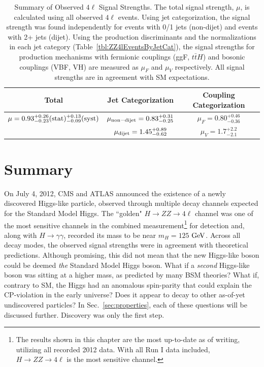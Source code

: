 \begin{table}[htbp]
\begin{center}
\begin{tabular}{c|c|c}
\hline \hline
      Total  & Jet Categorization  &  Coupling Categorization \\
      \hline
      $\mu = 0.93^{+0.26}_{-0.23}(\rm{stat}) ^{+0.13}_{-0.09}(\rm{syst})$ & $\mu_{\rm{non-dijet}}=0.83^{+0.31}_{-0.25}$ & $\mu_F = 0.80^{+0.46}_{-0.36}$ \\
      & $\mu_{\rm{dijet}} = 1.45^{+0.89}_{-0.62}$ & $\mu_V=1.7^{+2.2}_{-2.1}$  \\
      \hline
\end{tabular}
\caption[Summary of Observed $4\ell$ Signal Strengths]{Summary of Observed $4\ell$ Signal Strengths. The total signal strength, $\mu$, is calculated using all observed $4\ell$ events. Using jet categorization, the signal strength was found independently for events with 0/1 jets (non-dijet) and events with 2+ jets (dijet). Using the production discriminants and the normalizations in each jet category (Table~\ref{tbl:ZZ4lEventsByJetCat}), the signal strengths for production mechanisms with fermionic couplings (ggF, $t\bar{t}H$) and bosonic couplings (VBF, VH) are measured as $\mu_F$ and $\mu_V$ respectively. All signal strengths are in agreement with SM expectations.
\label{tbl:ZZ4lSignalStrengths}}
\end{center}
\end{table}

\section{Summary}
\label{sec:discovery_summary}

On July 4, 2012, CMS and ATLAS announced the existence of a newly discovered Higgs-like particle, observed through multiple decay channels expected for the Standard Model Higgs. The ``golden" $H \rightarrow ZZ \rightarrow 4\ell$ channel was one of the most sensitive channels in the combined measurement\footnote{The results shown in this chapter are the most up-to-date as of writing, utilizing all recorded 2012 data. With all Run I data included, $H \rightarrow ZZ \rightarrow 4\ell$ is the most sensitive channel.} for detection and, along with $H\rightarrow \gamma\gamma$, recorded its mass to be near $m_H=125$ $\rm{GeV}$. Across all decay modes, the observed signal strengths were in agreement with theoretical predictions. Although promising, this did not mean that the new Higgs-like boson could be deemed \textit{the} Standard Model Higgs boson. What if a \textit{second} Higgs-like boson was sitting at a higher mass, as predicted by many BSM theories? What if, contrary to SM, the Higgs had an anomalous spin-parity that could explain the CP-violation in the early universe? Does it appear to decay to other as-of-yet undiscovered particles? In Sec.~\ref{sec:properties}, each of these questions will be discussed further. Discovery was only the first step.
